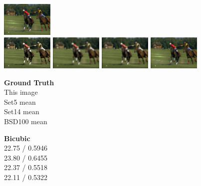 \documentclass[runningheads]{llncs}
\begin{document}
\begin{figure}[t]
  \includegraphics[width=0.22\textwidth]{bsd070_feat.png} \\
  \includegraphics[trim={160px 30px 150px 200px},width=0.22\textwidth,clip]{bsd070_orig.png}
  \includegraphics[trim={160px 30px 150px 200px},width=0.22\textwidth,clip]{bsd070_bicubic.png}
  \includegraphics[trim={160px 30px 150px 200px},width=0.22\textwidth,clip]{bsd070_pix.png}
  \includegraphics[trim={160px 30px 150px 200px},width=0.22\textwidth,clip]{bsd070_feat.png} \\
  \vspace{1mm}
  \begin{minipage}{0.22\textwidth}
    \centering \textbf{Ground Truth} \\ This image \\ Set5 mean \\ Set14 mean \\ BSD100 mean
  \end{minipage}
  \begin{minipage}{0.22\textwidth}
    \centering \textbf{Bicubic} \\ 22.75 / 0.5946 \\ 23.80 / 0.6455 \\ 22.37 / 0.5518 \\ 22.11 / 0.5322
  \end{minipage}
  \begin{minipage}{0.22\textwidth}

\end{minipage}
\end{figure}
\end{document}
